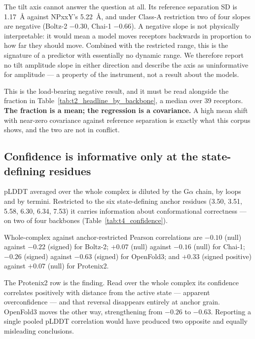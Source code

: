 The tilt axis cannot answer the question at all. Its reference separation SD is
1.17~\AA{} against NPxxY's 5.22~\AA, and under Class-A restriction two of four
slopes are negative (Boltz-2 $-0.30$, Chai-1 $-0.66$). A negative slope is not
physically interpretable: it would mean a model moves receptors backwards in
proportion to how far they should move. Combined with the restricted range, this
is the signature of a predictor with essentially no dynamic range. We therefore
report no tilt amplitude slope in either direction and describe the axis as
uninformative for amplitude --- a property of the instrument, not a result about
the models.

This is the load-bearing negative result, and it must be read alongside the
fraction in Table~\ref{tab:t2_headline_by_backbone}, a median over 39 receptors. \textbf{The fraction is a mean;
the regression is a covariance.} A high mean shift with near-zero covariance
against reference separation is exactly what this corpus shows, and the two are
not in conflict.

\subsection*{Confidence is informative only at the state-defining residues}

pLDDT averaged over the whole complex is diluted by the G$\alpha$ chain, by loops
and by termini. Restricted to the six state-defining anchor residues (3.50,
3.51, 5.58, 6.30, 6.34, 7.53) it carries information about conformational
correctness --- on two of four backbones (Table~\ref{tab:t4_confidence}).

Whole-complex against anchor-restricted Pearson correlations are $-0.10$ (null)
against $-0.22$ (signed) for Boltz-2; $+0.07$ (null) against $-0.16$ (null) for
Chai-1; $-0.26$ (signed) against $-0.63$ (signed) for OpenFold3; and $+0.33$
(signed positive) against $+0.07$ (null) for Protenix2.

The Protenix2 row is the finding. Read over the whole complex its confidence
correlates positively with distance from the active state --- apparent
overconfidence --- and that reversal disappears entirely at anchor grain.
OpenFold3 moves the other way, strengthening from $-0.26$ to $-0.63$. Reporting
a single pooled pLDDT correlation would have produced two opposite and equally
misleading conclusions.

